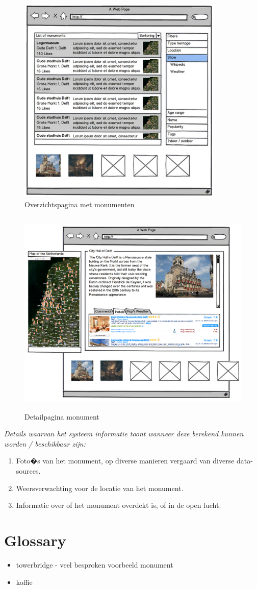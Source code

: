 \documentclass[a4paper,10pt]{article}
\begin{document}
			\begin{figure}[ht!]
				\centering
				\includegraphics[height=10cm]{interface2.png}
				\caption{Overzichtspagina met monumenten \label{interface2}}
			\end{figure}
			
			\begin{figure}[ht!]
				\centering
				\includegraphics[height=10cm]{interface3.png}
				\caption{Detailpagina monument \label{interface3}}
			\end{figure}
			\textit{Details waarvan het systeem informatie toont wanneer deze berekend kunnen worden / beschikbaar zijn:}
			\begin{enumerate}
				\item Foto�s van het monument, op diverse manieren vergaard van diverse data-sources.
				\item Weersverwachting voor de locatie van het monument.
				\item Informatie over of het monument overdekt is, of in de open lucht.
			\end{enumerate}
	
	\clearpage
	\section{Glossary}
		\begin{itemize}
			\item towerbridge - veel besproken voorbeeld monument
			\item koffie
		\end{itemize}
\end{document}
